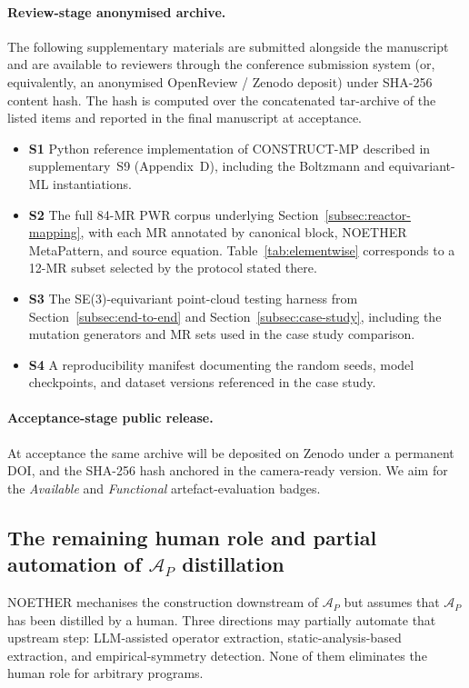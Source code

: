 \documentclass[acmsmall, screen]{acmart}
\begin{document}
\paragraph{Review-stage anonymised archive.} The following supplementary materials are submitted alongside the manuscript and are available to reviewers through the conference submission system (or, equivalently, an anonymised OpenReview / Zenodo deposit) under SHA-256 content hash. The hash is computed over the concatenated tar-archive of the listed items and reported in the final manuscript at acceptance.
\begin{itemize}
    \item \textbf{S1} Python reference implementation of CONSTRUCT-MP described in supplementary~S9 (Appendix~D), including the Boltzmann and equivariant-ML instantiations.
    \item \textbf{S2} The full 84-MR PWR corpus underlying Section~\ref{subsec:reactor-mapping}, with each MR annotated by canonical block, NOETHER MetaPattern, and source equation. Table~\ref{tab:elementwise} corresponds to a 12-MR subset selected by the protocol stated there.
    \item \textbf{S3} The SE(3)-equivariant point-cloud testing harness from Section~\ref{subsec:end-to-end} and Section~\ref{subsec:case-study}, including the mutation generators and MR sets used in the case study comparison.
    \item \textbf{S4} A reproducibility manifest documenting the random seeds, model checkpoints, and dataset versions referenced in the case study.
\end{itemize}

\paragraph{Acceptance-stage public release.} At acceptance the same archive will be deposited on Zenodo under a permanent DOI, and the SHA-256 hash anchored in the camera-ready version. We aim for the \emph{Available} and \emph{Functional} artefact-evaluation badges.

\subsection{The remaining human role and partial automation of \texorpdfstring{$\mathcal{A}_P$}{A\_P} distillation}
\label{subsec:remaining-human-role}

NOETHER mechanises the construction downstream of $\mathcal{A}_P$ but assumes that $\mathcal{A}_P$ has been distilled by a human. Three directions may partially automate that upstream step: LLM-assisted operator extraction, static-analysis-based extraction, and empirical-symmetry detection. None of them eliminates the human role for arbitrary programs.
\end{document}
